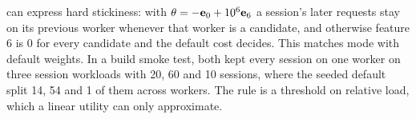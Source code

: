 \lc{} can express hard stickiness: with $\theta = -\mathbf{e}_{0} + 10^{6}\mathbf{e}_{6}$ a session's later
requests stay on its previous worker whenever that worker is a candidate, and otherwise feature 6
is 0 for every candidate and the default cost decides. This matches  mode with default
weights. In a build smoke test, both kept every session on one worker on three session workloads
with 20, 60 and 10 sessions, where the seeded default split 14, 54 and 1 of them across workers.
The  rule is a threshold on relative load, which a linear utility can only
approximate.
